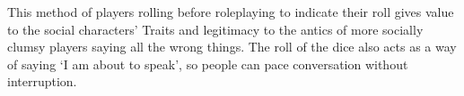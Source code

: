 \begin{multicols}{2}
This method of players rolling before roleplaying to indicate their roll gives value to the social characters' Traits and legitimacy to the antics of more socially clumsy players saying all the wrong things.
The roll of the dice also acts as a way of saying `I am about to speak', so people can pace conversation without interruption.

\end{multicols}


